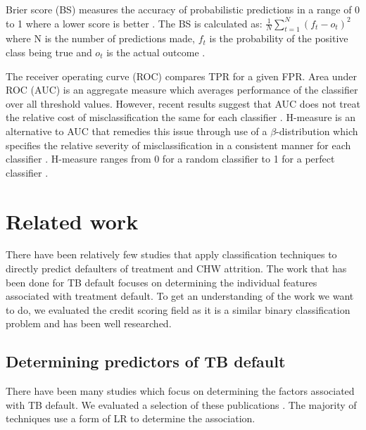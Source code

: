 \documentclass{sig-alternate-05-2015}
\begin{document}
	Brier score (BS) measures the accuracy of probabilistic predictions in a range of 0 to 1 where a lower score is better \cite{steyerberg2010assessing}. The BS is calculated as: $\frac{1}{N}\sum_{t=1}^{N}(f_t - o_t)^2$ where N is the number of predictions made, $f_t$ is the probability of the positive class being true and $o_t$ is the actual outcome \cite{steyerberg2010assessing}.
	
	The receiver operating curve (ROC) compares TPR for a given FPR. Area under ROC (AUC) is an aggregate measure which averages performance of the classifier over all threshold values. However, recent results suggest that AUC does not treat the relative cost of misclassification the same for each classifier \cite{Hand:2009:MCP:1612990.1613009}. H-measure is an alternative to AUC that remedies this issue through use of a $\beta$-distribution which specifies the relative severity of misclassification in a consistent manner for each classifier \cite{Hand:2009:MCP:1612990.1613009}. H-measure ranges from 0 for a random classifier to 1 for a perfect classifier \cite{Hand:2009:MCP:1612990.1613009}.
	
	\section{Related work}
	There have been relatively few studies that apply classification techniques to directly predict defaulters of treatment and CHW attrition. The work that has been done for TB default focuses on determining the individual features associated with treatment default. To get an understanding of the work we want to do, we evaluated the credit scoring field as it is a similar binary classification problem and has been well researched. 
	\subsection{Determining predictors of TB default}
	\label{predictors_of_defaulters_related_work}
	There have been many studies which focus on determining the factors associated with TB default. We evaluated a selection of these publications \cite{chan:2003prevalence, Jha:10.1371/journal.pone.0008873, jittimanee:10.1111/j.1440-172X.2007.00650.x, Lackey:10356751520150601, muture:6660173120110101, Shargie:10.1371/journal.pmed.0040037}. The majority of techniques use a form of LR to determine the association. 
	
\end{document}
